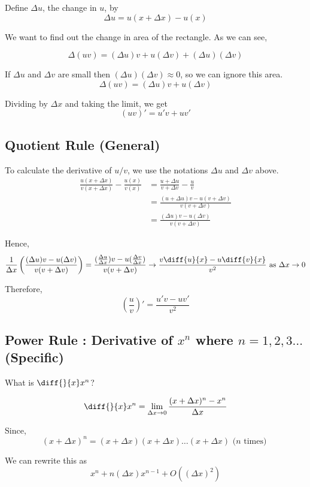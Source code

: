 Define $\Delta u$, the change in $u$, by $$\Delta u = u(x+\Delta x) - u(x)$$

We want to find out the change in area of the rectangle. As we can see, 

$$\Delta(uv) = (\Delta u)v + u(\Delta v) + (\Delta u)(\Delta v)$$

If $\Delta u$ and $\Delta v$ are small then $(\Delta u)(\Delta v) \approx 0$, so we can ignore this area.
$$\Delta(uv) = (\Delta u)v + u(\Delta v)$$

Dividing by $\Delta x$ and taking the limit, we get
$$(uv)' = u'v + uv'$$

\subsection{Quotient Rule (General)}

To calculate the derivative of $u/v$, we use the notations $\Delta u$ and $\Delta v$ above.
\begin{equation*}
\begin{split}
	\frac{u(x+\Delta x)}{v(x+\Delta x)} - \frac{u(x)}{v(x)}
		& = \frac{u + \Delta u}{v + \Delta v} - \frac{u}{v} \\
		& = \frac{(u+\Delta u)v - u(v+\Delta v)}{v(v+\Delta v)} \\
		& = \frac{(\Delta u)v - u(\Delta v)}{v(v+\Delta v)}
\end{split}
\end{equation*}

Hence,
$$
\frac{1}{\Delta x} \left( \frac{(\Delta u)v - u(\Delta v)}{v(v+\Delta v)} \right)
	= \frac{(\frac{\Delta u}{\Delta x})v - u(\frac{\Delta v}{\Delta x})}{v(v+\Delta v)}
	\to \frac{v\diff{u}{x} - u\diff{v}{x}}{v^2} \text{ as } \Delta x \to 0
$$

Therefore, 
$$(\frac{u}{v})' = \frac{u'v - uv'}{v^2}$$



\subsection{Power Rule : Derivative of $x^n$ where $n = 1,2,3\ldots$ (Specific)}

What is $\diff{}{x} x^n$?

$$ \diff{}{x} x^n = \lim_{\Delta x \to 0} \frac{(x+\Delta x)^n - x^n}{\Delta x} $$

Since, $$ (x+\Delta x)^n = (x+\Delta x)(x+\Delta x)\ldots(x+\Delta x) \text{ ($n$ times) } $$

We can rewrite this as $$ x^n + n(\Delta x)x^{n-1} + O((\Delta x)^2) $$

